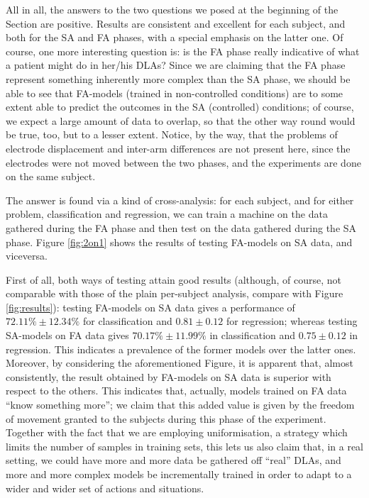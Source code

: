 \documentclass[10pt]{bmc_article}
\newenvironment{bmcformat}{\begin{raggedright}\baselineskip20pt\sloppy\setboolean{publ}{false}}{\end{raggedright}\baselineskip20pt\sloppy}
\begin{document}
\begin{bmcformat}
All in all, the answers to the two questions we posed at the beginning
of the Section are positive. Results are consistent and excellent for
each subject, and both for the SA and FA phases, with a special
emphasis on the latter one. Of course, one more interesting question
is: is the FA phase really indicative of what a patient might do in
her/his DLAs? Since we are claiming that the FA phase represent
something inherently more complex than the SA phase, we should be able
to see that FA-models (trained in non-controlled conditions) are to
some extent able to predict the outcomes in the SA (controlled)
conditions; of course, we expect a large amount of data to overlap, so
that the other way round would be true, too, but to a lesser
extent. Notice, by the way, that the problems of electrode
displacement and inter-arm differences are not present here, since the
electrodes were not moved between the two phases, and the experiments
are done on the same subject.

The answer is found via a kind of cross-analysis: for each subject,
and for either problem, classification and regression, we can train a
machine on the data gathered during the FA phase and then test on the
data gathered during the SA phase. Figure \ref{fig:2on1} shows the
results of testing FA-models on SA data, and viceversa.


First of all, both ways of testing attain good results (although, of
course, not comparable with those of the plain per-subject analysis,
compare with Figure \ref{fig:results}): testing FA-models on SA data
gives a performance of $72.11\% \pm 12.34\%$ for classification and
$0.81 \pm 0.12$ for regression; whereas testing SA-models on FA data
gives $70.17\% \pm 11.99\%$ in classification and $0.75 \pm 0.12$ in
regression. This indicates a prevalence of the former models over the
latter ones. Moreover, by considering the aforementioned Figure, it is
apparent that, almost consistently, the result obtained by FA-models
on SA data is superior with respect to the others. This indicates
that, actually, models trained on FA data ``know something more''; we
claim that this added value is given by the freedom of movement
granted to the subjects during this phase of the experiment. Together
with the fact that we are employing uniformisation, a strategy which
limits the number of samples in training sets, this lets us also claim
that, in a real setting, we could have more and more data be gathered
off ``real'' DLAs, and more and more complex models be incrementally
trained in order to adapt to a wider and wider set of actions and
situations.


\end{bmcformat}
\end{document}
